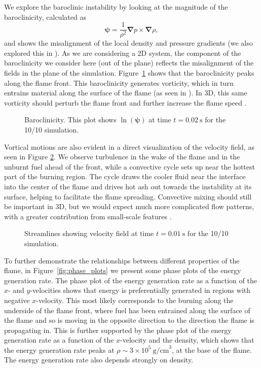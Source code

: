 \documentclass[trackchanges,preprint,times,tighten]{aastex63}
\newcommand{\nablab}{\mathbf{\nabla}}
\begin{document}
We explore the baroclinic instability by looking at the magnitude of the 
baroclinicity, calculated as
\begin{equation}
    \boldsymbol{\psi} = \frac{1}{\rho^2} \nablab p \times \nablab \rho,
\end{equation}
and shows the misalignment of the local density and pressure gradients
(we also explored this in \citealt{Malone2014a}). As we are considering a 2D system, the
component of the baroclinicity we consider here (out of the plane)
reflects the misalignment of the fields in the plane of the
simulation. Figure~\ref{fig:baroclinicity} shows that the
baroclinicity peaks along the flame front. This baroclinicity
generates vorticity, which in turn entrains material along the surface
of the flame (as seen in \citealt{cavecchi:2013}). In 3D, this same vorticity
should perturb the flame front and further increase the flame speed
\citep{Cavecchi2019}.

\begin{figure}[t]
\centering
{}
\caption{\label{fig:baroclinicity} Baroclinicity. This plot shows
$\ln \left(\mathbf{\psi}\right)$ at time $t = 0.02~\mathrm{s}$ for the 10/10 simulation.}
\end{figure}

Vortical motions are also evident in a direct visualization of the velocity field, as seen in
Figure \ref{fig:streamlines}. We observe turbulence in the wake of the flame and in the
unburnt fuel ahead of the front, while a convective cycle sets up near the hottest part of the
burning region. The cycle draws the cooler fluid near the interface into the center of the flame
and drives hot ash out towards the instability at its surface, helping to facilitate the flame
spreading. Convective mixing should still be important in 3D, but we would expect much more
complicated flow patterns, with a greater contribution from small-scale features \citep{xrb3d}.

\begin{figure}[t]
	\centering
	\caption{\label{fig:streamlines} Streamlines showing velocity field at time $t = 0.01~\mathrm{s}$ for the 10/10 simulation.}
\end{figure}

To further demonstrate the relationships between different properties
of the flame, in Figure~\ref{fig:phase_plots} we present some phase
plots of the energy generation rate. The phase plot of the energy
generation rate as a function of the $x$- and $y$-velocities shows
that energy is preferentially generated in regions with negative
$x$-velocity. This most likely corresponds to the burning along the
underside of the flame front, where fuel has been entrained along the
surface of the flame and so is moving in the opposite direction to the
direction the flame is propagating in. This is further supported by
the phase plot of the energy generation rate as a function of the
$x$-velocity and the density, which shows that the energy generation
rate peaks at $\rho \sim 3 \times 10^5~\mathrm{g/cm}^3$, at the base
of the flame.  The energy generation rate also depends strongly on density.
\end{document}
